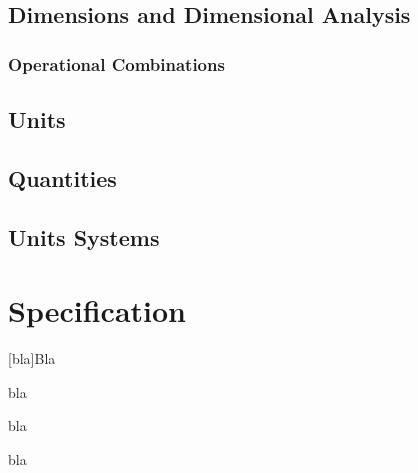 \documentclass[ebook,11pt,article]{memoir}
\begin{document}
\section{Dimensions and Dimensional Analysis}

\subsection{Operational Combinations}

\section{Units}

\section{Quantities}

\section{Units Systems}


\chapter{Specification}


[bla]{Bla}

%
\begin{itemdecl}
bla
\end{itemdecl}

\begin{itemdescr}
\pnum
\requires
bla

\pnum
\effects
bla
\end{itemdescr}
\end{document}
